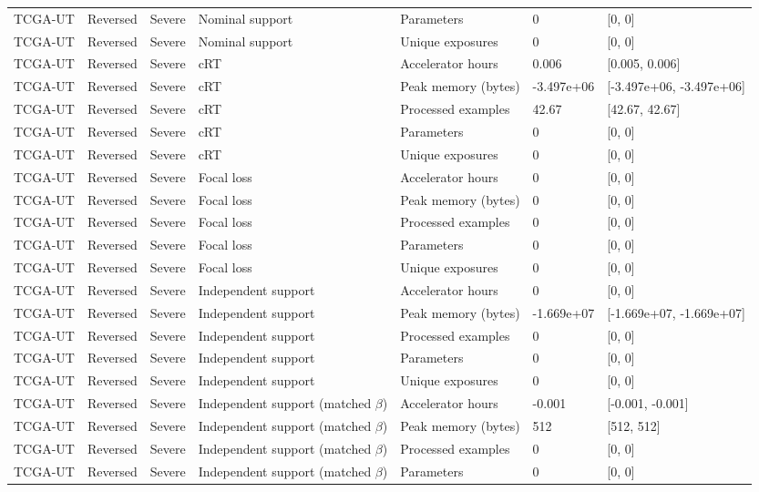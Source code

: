 \begin{longtable}{lllllll}
TCGA-UT & Reversed & Severe & Nominal support & Parameters & 0 & [0, 0] \\
TCGA-UT & Reversed & Severe & Nominal support & Unique exposures & 0 & [0, 0] \\
TCGA-UT & Reversed & Severe & cRT & Accelerator hours & 0.006 & [0.005, 0.006] \\
TCGA-UT & Reversed & Severe & cRT & Peak memory (bytes) & -3.497e+06 & [-3.497e+06, -3.497e+06] \\
TCGA-UT & Reversed & Severe & cRT & Processed examples & 42.67 & [42.67, 42.67] \\
TCGA-UT & Reversed & Severe & cRT & Parameters & 0 & [0, 0] \\
TCGA-UT & Reversed & Severe & cRT & Unique exposures & 0 & [0, 0] \\
TCGA-UT & Reversed & Severe & Focal loss & Accelerator hours & 0 & [0, 0] \\
TCGA-UT & Reversed & Severe & Focal loss & Peak memory (bytes) & 0 & [0, 0] \\
TCGA-UT & Reversed & Severe & Focal loss & Processed examples & 0 & [0, 0] \\
TCGA-UT & Reversed & Severe & Focal loss & Parameters & 0 & [0, 0] \\
TCGA-UT & Reversed & Severe & Focal loss & Unique exposures & 0 & [0, 0] \\
TCGA-UT & Reversed & Severe & Independent support & Accelerator hours & 0 & [0, 0] \\
TCGA-UT & Reversed & Severe & Independent support & Peak memory (bytes) & -1.669e+07 & [-1.669e+07, -1.669e+07] \\
TCGA-UT & Reversed & Severe & Independent support & Processed examples & 0 & [0, 0] \\
TCGA-UT & Reversed & Severe & Independent support & Parameters & 0 & [0, 0] \\
TCGA-UT & Reversed & Severe & Independent support & Unique exposures & 0 & [0, 0] \\
TCGA-UT & Reversed & Severe & Independent support (matched $\beta$) & Accelerator hours & -0.001 & [-0.001, -0.001] \\
TCGA-UT & Reversed & Severe & Independent support (matched $\beta$) & Peak memory (bytes) & 512 & [512, 512] \\
TCGA-UT & Reversed & Severe & Independent support (matched $\beta$) & Processed examples & 0 & [0, 0] \\
TCGA-UT & Reversed & Severe & Independent support (matched $\beta$) & Parameters & 0 & [0, 0] \\

\end{longtable}
